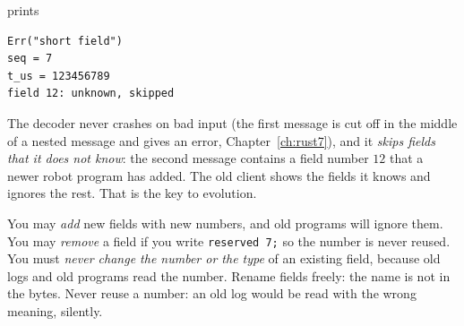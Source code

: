 prints
\begin{verbatim}
Err("short field")
seq = 7
t_us = 123456789
field 12: unknown, skipped
\end{verbatim}
The decoder never crashes on bad input (the first message is cut off in the middle of a nested message and gives an error, Chapter~\ref{ch:rust7}), and it \emph{skips fields that it does not know}: the second message contains a field number $12$ that a newer robot program has added. The old client shows the fields it knows and ignores the rest. That is the key to evolution.
\begin{keyidea}
You may \emph{add} new fields with new numbers, and old programs will ignore them. You may \emph{remove} a field if you write \verb!reserved 7;! so the number is never reused. You must \emph{never change the number or the type} of an existing field, because old logs and old programs read the number. Rename fields freely: the name is not in the bytes. Never reuse a number: an old log would be read with the wrong meaning, silently.
\end{keyidea}

